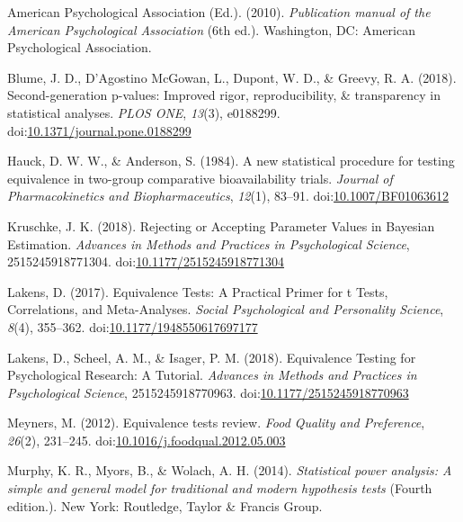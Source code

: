 \documentclass[,man,floatsintext]{apa6}
\begin{document}
\setlength{\parindent}{-0.5in}
\setlength{\leftskip}{0.5in}

\hypertarget{refs}{}
\leavevmode\hypertarget{ref-american_psychological_association_publication_2010}{}%
American Psychological Association (Ed.). (2010). \emph{Publication manual of the American Psychological Association} (6th ed.). Washington, DC: American Psychological Association.

\leavevmode\hypertarget{ref-blume_second-generation_2018}{}%
Blume, J. D., D'Agostino McGowan, L., Dupont, W. D., \& Greevy, R. A. (2018). Second-generation p-values: Improved rigor, reproducibility, \& transparency in statistical analyses. \emph{PLOS ONE}, \emph{13}(3), e0188299. doi:\href{https://doi.org/10.1371/journal.pone.0188299}{10.1371/journal.pone.0188299}

\leavevmode\hypertarget{ref-hauck_new_1984}{}%
Hauck, D. W. W., \& Anderson, S. (1984). A new statistical procedure for testing equivalence in two-group comparative bioavailability trials. \emph{Journal of Pharmacokinetics and Biopharmaceutics}, \emph{12}(1), 83--91. doi:\href{https://doi.org/10.1007/BF01063612}{10.1007/BF01063612}

\leavevmode\hypertarget{ref-kruschke_rejecting_2018}{}%
Kruschke, J. K. (2018). Rejecting or Accepting Parameter Values in Bayesian Estimation. \emph{Advances in Methods and Practices in Psychological Science}, 2515245918771304. doi:\href{https://doi.org/10.1177/2515245918771304}{10.1177/2515245918771304}

\leavevmode\hypertarget{ref-lakens_equivalence_2017}{}%
Lakens, D. (2017). Equivalence Tests: A Practical Primer for t Tests, Correlations, and Meta-Analyses. \emph{Social Psychological and Personality Science}, \emph{8}(4), 355--362. doi:\href{https://doi.org/10.1177/1948550617697177}{10.1177/1948550617697177}

\leavevmode\hypertarget{ref-lakens_equivalence_2018}{}%
Lakens, D., Scheel, A. M., \& Isager, P. M. (2018). Equivalence Testing for Psychological Research: A Tutorial. \emph{Advances in Methods and Practices in Psychological Science}, 2515245918770963. doi:\href{https://doi.org/10.1177/2515245918770963}{10.1177/2515245918770963}

\leavevmode\hypertarget{ref-meyners_equivalence_2012}{}%
Meyners, M. (2012). Equivalence tests review. \emph{Food Quality and Preference}, \emph{26}(2), 231--245. doi:\href{https://doi.org/10.1016/j.foodqual.2012.05.003}{10.1016/j.foodqual.2012.05.003}

\leavevmode\hypertarget{ref-murphy_statistical_2014}{}%
Murphy, K. R., Myors, B., \& Wolach, A. H. (2014). \emph{Statistical power analysis: A simple and general model for traditional and modern hypothesis tests} (Fourth edition.). New York: Routledge, Taylor \& Francis Group.
\end{document}
